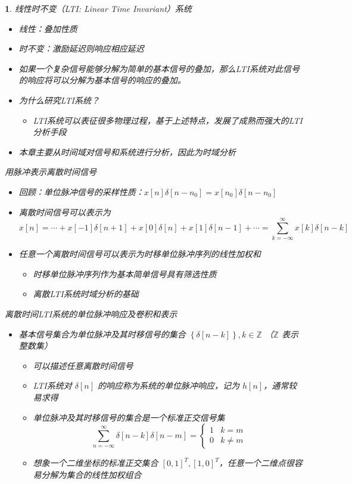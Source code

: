 \documentclass[UTF8]{report}
\theoremstyle{MyLineTheoremStyle} %
\theoremstyle{MyBlockTheoremStyle} %
\theoremstyle{MySubsubsectionStyle} %
\newtheorem{definition}{}
\begin{document}
\begin{definition}
    线性时不变（LTI: Linear Time Invariant）系统
    \begin{itemize}
        \item 线性：叠加性质
        \item 时不变：激励延迟则响应相应延迟
    \end{itemize}
    \begin{itemize}
        \item 如果一个复杂信号能够分解为简单的基本信号的叠加，那么LTI系统对此信号的响应将可以分解为基本信号的响应的叠加。
        \item 为什么研究LTI系统？
        \begin{itemize}
            \item LTI系统可以表征很多物理过程，基于上述特点，发展了成熟而强大的LTI分析手段
        \end{itemize}
        \item 本章主要从时间域对信号和系统进行分析，因此为时域分析
    \end{itemize}

    用脉冲表示离散时间信号
    \begin{itemize}
        \item 回顾：单位脉冲信号的采样性质：$x[n] \delta[n - n_0] = x[n_0] \delta[n - n_0]$
        \item 离散时间信号可以表示为
        \[
        x[n] = \cdots + x[-1] \delta[n + 1] + x[0] \delta[n] + x[1] \delta[n - 1] + \cdots = \sum_{k=-\infty}^{\infty} x[k] \delta[n - k]
        \]
        \item 任意一个离散时间信号可以表示为时移单位脉冲序列的线性加权和
        \begin{itemize}
            \item 时移单位脉冲序列作为基本简单信号具有筛选性质
            \item 离散LTI系统时域分析的基础
        \end{itemize}
    \end{itemize}

    离散时间LTI系统的单位脉冲响应及卷积和表示
    \begin{itemize}
        \item 基本信号集合为单位脉冲及其时移信号的集合 $\left\{\delta[n - k] \right\}, k \in \mathbb{Z}$ （$\mathbb{Z}$ 表示整数集）
        \begin{itemize}
            \item 可以描述任意离散时间信号
            \item LTI系统对 $\delta[n]$ 的响应称为系统的单位脉冲响应，记为 $h[n]$，通常较易求得
            \item 单位脉冲及其时移信号的集合是一个标准正交信号集
            \[
            \sum_{n=-\infty}^{\infty} \delta[n - k] \delta[n - m] = \begin{cases} 
            1 & k = m \\
            0 & k \neq m 
            \end{cases}
            \]
            \item 想象一个二维坐标的标准正交集合 $[0,1]^T, [1,0]^T$，任意一个二维点很容易分解为集合的线性加权组合
        \end{itemize}


\end{itemize}
\end{definition}
\end{document}
